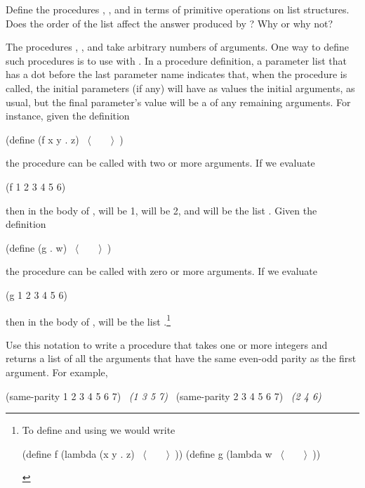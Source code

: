 \begin{exerciseGroup}
Define the procedures ,
, and  in terms of primitive
operations on list structures.  Does the order of the list 
affect the answer produced by ?  Why or why not?

\label{Exercise 2.20}
 The procedures \code{+},
\code{*}, and  take arbitrary numbers of arguments. One way to
define such procedures is to use  with .  In a procedure definition, a parameter list that has a dot before
the last parameter name indicates that, when the procedure is called, the
initial parameters (if any) will have as values the initial arguments, as
usual, but the final parameter's value will be a  of any
remaining arguments.  For instance, given the definition

\begin{codeBlock}
(define (f x y . z) ~\(\langle \)~~~~\(\rangle \)~)
\end{codeBlock}

\noindent
the procedure  can be called with two or more arguments.  If we
evaluate

\begin{codeBlock}
(f 1 2 3 4 5 6)
\end{codeBlock}

\noindent
then in the body of ,  will be 1,  will be 2, and
 will be the list \mbox{}.  Given the definition

\begin{codeBlock}
(define (g . w) ~\(\langle \)~~~~\(\rangle \)~)
\end{codeBlock}

\noindent
the procedure  can be called with zero or more arguments.  If we
evaluate

\begin{codeBlock}
(g 1 2 3 4 5 6)
\end{codeBlock}

\noindent
then in the body of ,  will be the list .\footnote{To define  and  using  we would
write

\begin{compactCodeBlock}
(define f (lambda (x y . z) ~\(\langle \)~~~~\(\rangle \)~))
(define g (lambda w ~\(\langle \)~~~~\(\rangle \)~))
\end{compactCodeBlock}
}

Use this notation to write a procedure  that takes one or
more integers and returns a list of all the arguments that have the same
even-odd parity as the first argument.  For example,

\begin{codeBlock}
(same-parity 1 2 3 4 5 6 7)
~\textit{(1 3 5 7)}~
(same-parity 2 3 4 5 6 7)
~\textit{(2 4 6)}~
\end{codeBlock}
\end{exerciseGroup}

